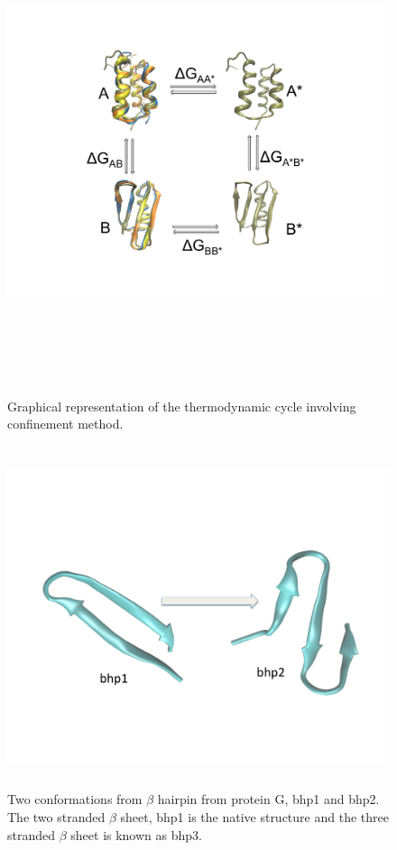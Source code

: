 \documentclass[12pt]{article}
\begin{document}
\begin{figure}
\begin{center}
\includegraphics[width=14cm,height=14cm]{method.pdf}
\end{center}
\caption{Graphical representation of the thermodynamic cycle involving confinement method.}
\label{fig:method}
\end{figure}


\begin{figure}
\begin{center}
\includegraphics[width=12cm,height=10cm]{bhp.pdf}
\end{center}
\caption{Two conformations from $\beta$ hairpin from protein G, bhp1 and bhp2. The two stranded $\beta$ sheet, bhp1 is the native structure and the three stranded $\beta$ sheet is known as bhp3.}
\label{fig:bhp_conf}
\end{figure}
\end{document}
